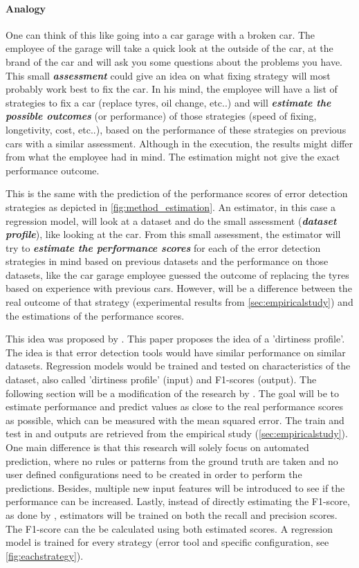 \newpage
\paragraph{Analogy} One can think of this like going into a car garage with a broken car. The employee of the garage will take a quick look at the outside of the car, at the brand of the car and will ask you some questions about the problems you have. This small \textit{\textbf{assessment}} could give an idea on what fixing strategy will most probably work best to fix the car. In his mind, the employee will have a list of strategies to fix a car (replace tyres, oil change, etc..) and will \textbf{\textit{estimate the possible outcomes}} (or performance) of those strategies (speed of fixing, longetivity, cost, etc..), based on the performance of these strategies on previous cars with a similar assessment. Although in the execution, the results might differ from what the employee had in mind. The estimation might not give the exact performance outcome.

This is the same with the prediction of the performance scores of error detection strategies as depicted in \autoref{fig:method_estimation}. An estimator, in this case a regression model, will look at a dataset and do the small assessment (\textbf{\textit{dataset profile}}), like looking at the car. From this small assessment, the estimator will try to \textbf{\textit{estimate the performance scores}} for each of the error detection strategies in mind based on previous datasets and the performance on those datasets, like the car garage employee guessed the outcome of replacing the tyres based on experience with previous cars. However, will be a difference between the real outcome of that strategy (experimental results from \autoref{sec:empiricalstudy}) and the estimations of the performance scores. 

This idea was proposed by \cite{Mahdavi2019-pk}. This paper proposes the idea of a 'dirtiness profile'. The idea is that error detection tools would have similar performance on similar datasets. Regression models would be trained and tested on characteristics of the dataset, also called 'dirtiness profile' (input) and F1-scores (output). The following section will be a modification of the research by \cite{Mahdavi2019-pk}. 
The goal will be to estimate performance and predict values as close to the real performance scores as possible, which can be measured with the mean squared error.
The train and test in and outputs are retrieved from the empirical study (\autoref{sec:empiricalstudy}). One main difference is that this research will solely focus on automated prediction, where no rules or patterns from the ground truth are taken and no user defined configurations need to be created in order to perform the predictions. Besides, multiple new input features will be introduced to see if the performance can be increased. Lastly, instead of directly estimating the F1-score, as done by \cite{Mahdavi2019-pk}, estimators will be trained on both the recall and precision scores. The F1-score can the be calculated using both estimated scores.
A regression model is trained for every strategy (error tool and specific configuration, see \autoref{fig:eachstrategy}). 

